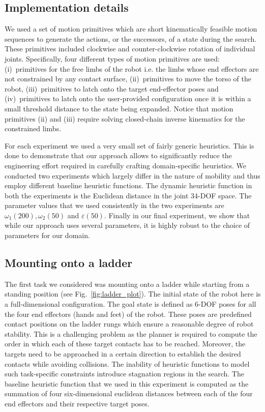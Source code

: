 \documentclass{article}
\begin{document}
\subsection{Implementation details}
We used a set of motion primitives which are short kinematically feasible motion sequences to generate the actions, or the successors, of a state during the search. These primitives included clockwise and counter-clockwise rotation of individual joints. 
Specifically, four different types of motion primitives are used:
(i)~primitives for the free limbs of the robot i.e. the limbs whose end effectors are not constrained by any contact surface,  
(ii)~primitives to move the torso of the robot,
(iii)~primitives to latch onto the target end-effector poses
and
(iv)~primitives to latch onto the user-provided configuration once it is within a small threshold distance to the state being expanded.
Notice that motion primitives (ii) and (iii) require solving closed-chain inverse kinematics for the constrained limbs.

For each experiment we used a very small set of fairly generic heuristics. 
This is done to demonstrate that our approach allows to significantly reduce the engineering effort required in carefully crafting domain-specific heuristics. 
We conducted two experiments which largely differ in the nature of mobility and thus employ different baseline heuristic functions. 
The dynamic heuristic function in both the experiments is the Euclidean distance in the joint 34-DOF space.
The parameter values that we used consistently in the two experiments are $\omega_1 (200), \omega_2 (50)$ and $\varepsilon (50)$.
Finally in our final experiment, we show that while our approach uses several parameters, it is highly robust to the choice of parameters for our domain.

\subsection{Mounting onto a ladder}
The first task we considered was  mounting onto a ladder while starting from a standing position  (see Fig.~\ref{fig:ladder_plot}). 
The initial state of the robot here is a full-dimensional configuration. The goal state is defined as 6-DOF poses for all the four end effectors (hands and feet) of the robot. These poses are predefined contact positions on the ladder rungs which ensure a reasonable degree of robot stability. 
This is a challenging problem as the planner is required to compute the order in which each of these target contacts has to be reached. Moreover, the targets need to be approached in a certain direction to establish the desired contacts while avoiding collisions. 
The inability of heuristic functions to model such task-specific constraints introduce stagnation regions in the search. 
The baseline heuristic function that we used in this experiment is computed as the summation of four six-dimensional euclidean distances between each of the four end effectors and their respective target poses.
\end{document}
